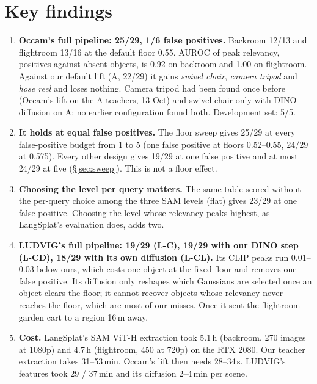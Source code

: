 \documentclass[11pt,a4paper]{article}
\begin{document}
\section{Key findings}
\begin{enumerate}[leftmargin=*,itemsep=2pt]
  \item \textbf{Occam's full pipeline: 25/29, 1/6 false positives.} Backroom 12/13 and flightroom 13/16 at the default floor
        0.55. AUROC of peak relevancy, positives against absent objects, is 0.92 on backroom and 1.00 on flightroom. Against
        our default lift (A, 22/29) it gains \emph{swivel chair}, \emph{camera tripod} and \emph{hose reel} and loses
        nothing. Camera tripod had been found once before (Occam's lift on the A teachers, 13 Oct) and swivel chair only with
        DINO diffusion on A; no earlier configuration found both. Development set: 5/5.
  \item \textbf{It holds at equal false positives.} The floor sweep gives 25/29 at every false-positive budget from 1 to 5
        (one false positive at floors 0.52--0.55, 24/29 at 0.575). Every other design gives 19/29 at one false positive and at most 24/29 at five
        (\S\ref{sec:sweep}). This is not a floor effect.
  \item \textbf{Choosing the level per query matters.} The same table scored without the per-query choice among the three
        SAM levels (flat) gives 23/29 at one false positive. Choosing the level whose relevancy peaks highest, as
        LangSplat's evaluation does, adds two.
  \item \textbf{LUDVIG's full pipeline: 19/29 (L-C), 19/29 with our DINO step (L-CD), 18/29 with its own diffusion (L-CL).}
        Its CLIP peaks run 0.01--0.03 below ours, which costs one object at the fixed floor and removes one false
        positive. Its diffusion only reshapes which Gaussians are selected once an object clears the floor; it cannot
        recover objects whose relevancy never reaches the floor, which are most of our misses. Once it sent the
        flightroom garden cart to a region 16\,m away.
  \item \textbf{Cost.} LangSplat's SAM ViT-H extraction took 5.1\,h (backroom, 270 images at 1080p) and 4.7\,h (flightroom,
        450 at 720p) on the RTX 2080. Our teacher extraction takes 31--53\,min. Occam's lift then needs 28--34\,s.
        LUDVIG's features took 29 / 37\,min and its diffusion 2--4\,min per scene.
\end{enumerate}
\end{document}
